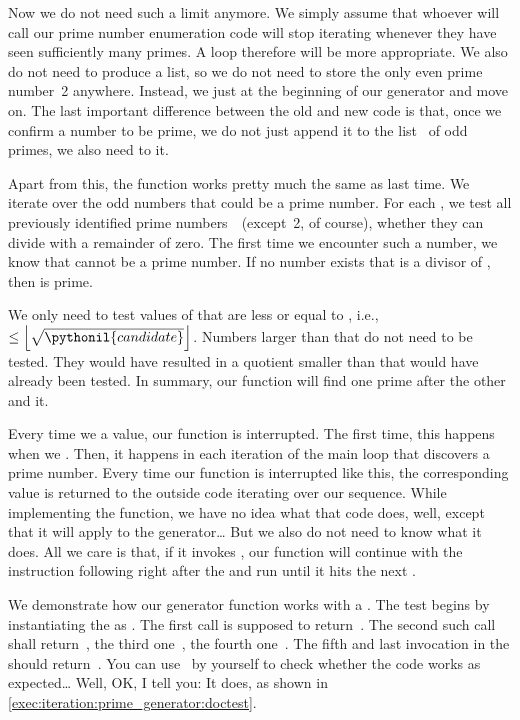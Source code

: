 Now we do not need such a limit anymore.
We simply assume that whoever will call our prime number enumeration code will stop iterating whenever they have seen sufficiently many primes.
A  loop therefore will be more appropriate.
We also do not need to produce a list, so we do not need to store the only even prime number~2 anywhere.
Instead, we just  at the beginning of our generator and move on.
The last important difference between the old and new code is that, once we confirm a number to be prime, we do not just append it to the list~ of odd primes, we also need to  it.

Apart from this, the function works pretty much the same as last time.
We iterate over the odd numbers  that could be a prime number.
For each , we test all previously identified prime numbers~~(except~2, of course), whether they can divide  with a remainder of zero.
The first time we encounter such a number, we know that  cannot be a prime number.
If no number  exists that is a divisor of , then  is prime.%
%
\begin{sloppypar}%
We only need to test values of  that are less or equal to , i.e., $\leq\left\lfloor\sqrt{\pythonil{candidate}}\right\rfloor$.
Numbers larger than that do not need to be tested.
They would have resulted in a quotient smaller than  that would have already been tested.
In summary, our function will find one prime after the other and  it.%
\end{sloppypar}%
%
Every time we  a value, our function is interrupted.
The first time, this happens when we .
Then, it happens in each iteration of the main loop that discovers a prime number.
Every time our function is interrupted like this, the corresponding value is returned to the outside code iterating over our sequence.
While implementing the function, we have no idea what that code does, well, except that it will apply  to the generator{\dots}
But we also do not need to know what it does.
All we care is that, if it invokes , our function will continue with the instruction following right after the  and run until it hits the next .

We demonstrate how our generator function works with a .
The test begins by instantiating the  as .
The first  call is supposed to return~.
The second such call shall return~, the third one~, the fourth one~.
The fifth and last  invocation in the  should return~.
You can use \pytest\ by yourself to check whether the code works as expected\dots%
Well, OK, I tell you:
It does, as shown in \cref{exec:iteration:prime_generator:doctest}.

